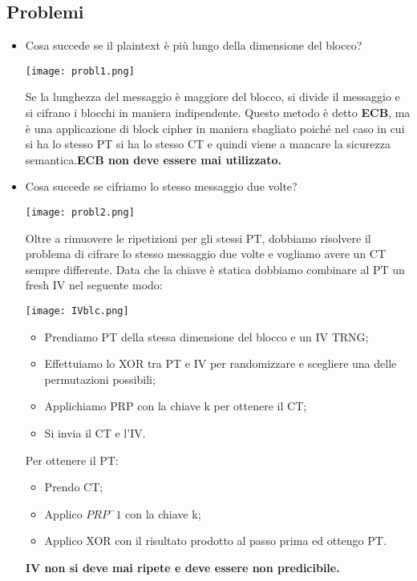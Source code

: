 \documentclass{article}
\theoremstyle{remark}
\begin{document}
\subsection{Problemi}
\begin{itemize}
    \item Cosa succede se il plaintext è più lungo della dimensione del blocco?
    \begin{center}
        \texttt{[image: probl1.png]}
    \end{center}
    Se la lunghezza del messaggio è maggiore del blocco, si divide il messaggio e si cifrano i blocchi in maniera indipendente. Questo metodo è detto \textbf{ECB}, ma è una applicazione di block cipher in maniera sbagliato poiché nel caso in cui si ha lo stesso PT si ha lo stesso CT e quindi viene a mancare la sicurezza semantica.\newline \textbf{ECB non deve essere mai utilizzato.}
    \item Cosa succede se cifriamo lo stesso messaggio due volte?
    \begin{center}
        \texttt{[image: probl2.png]}
    \end{center}
    Oltre a rimuovere le ripetizioni per gli stessi PT, dobbiamo risolvere il problema di cifrare lo stesso messaggio due volte e vogliamo avere un CT sempre differente. Data che la chiave è statica dobbiamo combinare al PT un fresh IV nel seguente modo:
    \begin{center}
        \texttt{[image: IVblc.png]}
    \end{center}
    \begin{itemize}
        \item Prendiamo PT della stessa dimensione del blocco e un IV TRNG;
        \item Effettuiamo lo XOR tra PT e IV per randomizzare e scegliere una delle permutazioni possibili;
        \item Applichiamo PRP con la chiave k per ottenere il CT;
        \item Si invia il CT e l'IV.
    \end{itemize}
    Per ottenere il PT:\begin{itemize}
        \item Prendo CT;
        \item Applico $PRP^-1$ con la chiave k;
        \item Applico XOR con il risultato prodotto al passo prima ed ottengo PT.
    \end{itemize}
    \textbf{IV non si deve mai ripete e deve essere non predicibile.}
\end{itemize}
\end{document}

